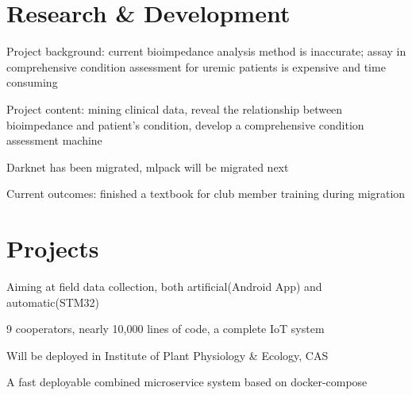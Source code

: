 \documentclass[]{deedy-resume-openfont}
\begin{document}
\begin{minipage}[t]{0.73\textwidth} 


\section{Research \& Development}
\descript{}
\vspace{\topsep}
\begin{tightemize}
\item Project background: current bioimpedance analysis method is inaccurate; assay in comprehensive condition assessment for uremic patients is expensive and time consuming
\item Project content: mining clinical data, reveal the relationship between bioimpedance and patient's condition, develop a comprehensive condition assessment machine
\end{tightemize}
\sectionsep

\descript{}
\begin{tightemize}
    \item Darknet has been migrated, mlpack will be migrated next
    \item Current outcomes: finished a textbook for club member training during migration
\end{tightemize}
\sectionsep

\section{Projects}
    \begin{tightemize}
        \item Aiming at field data collection, both artificial(Android App) and automatic(STM32)
        \item 9 cooperators, nearly 10,000 lines of code, a complete IoT system
		\item Will be deployed in Institute of Plant Physiology \& Ecology, CAS
		\item A fast deployable combined microservice system based on docker-compose
	\end{tightemize}
	\sectionsep


\end{minipage}
\end{document}

